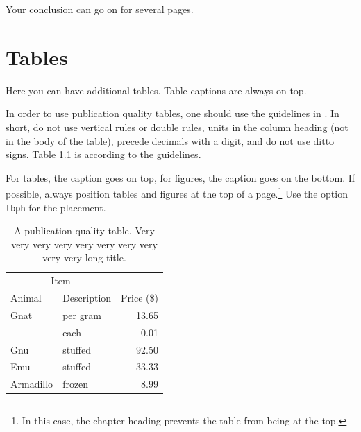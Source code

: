 \documentclass[msc,oneside]{ubcthesis}%
\begin{document}
\newpage
Your conclusion can go on for several pages.


%


\newpage %
\pagestyle{fancy}\rhead{}\cfoot{}\rfoot{\thepage}


%

\newpage
\pagestyle{headings}

\appendix 
\addappheadtotoc %
\appendixpage 



\chapter{Tables}
Here you can have additional tables. Table captions are always on top.

In order to use publication quality tables, one should use the guidelines in \cite{Fear:2005manual}. In short, do not use vertical rules or double rules, units in the column heading (not in the body of the table), precede decimals with a digit, and do not use ditto signs. Table \ref{table:food} is according to the guidelines. 

For tables, the caption goes on top, for figures, the caption goes on the bottom. If possible, always position tables and figures at the top of a page.\footnote{In this case, the chapter heading prevents the table from being at the top.} Use the option \verb|tbph| for the placement.

\begin{table}[tbph]
\centering
\caption{A publication quality table. Very very very very very very very very very very long title.
\label{table:food}}
\begin{tabular}{@{}llr@{}} \toprule 
\multicolumn{2}{c}{Item} \\ \cmidrule(r){1-2} 
Animal & Description & Price (\$)\\ \midrule 
Gnat & per gram & 13.65 \\ 
& each & 0.01 \\ 
Gnu & stuffed & 92.50 \\ 
Emu & stuffed & 33.33 \\ 
Armadillo & frozen & 8.99 \\ \bottomrule 
\end{tabular}
\end{table}
\end{document}
